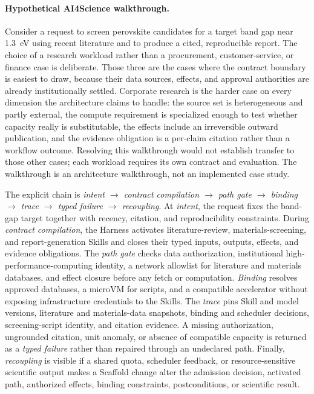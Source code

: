 \paragraph{Hypothetical AI4Science walkthrough.}
Consider a request to screen perovskite candidates for a target band gap near 1.3~eV using recent literature and to produce a cited, reproducible report. The choice of a research workload rather than a procurement, customer-service, or finance case is deliberate. Those three are the cases where the contract boundary is easiest to draw, because their data sources, effects, and approval authorities are already institutionally settled. Corporate research is the harder case on every dimension the architecture claims to handle: the source set is heterogeneous and partly external, the compute requirement is specialized enough to test whether capacity really is substitutable, the effects include an irreversible outward publication, and the evidence obligation is a per-claim citation rather than a workflow outcome. Resolving this walkthrough would not establish transfer to those other cases; each workload requires its own contract and evaluation. The walkthrough is an architecture walkthrough, not an implemented case study.

The explicit chain is \textit{intent $\rightarrow$ contract compilation $\rightarrow$ path gate $\rightarrow$ binding $\rightarrow$ trace $\rightarrow$ typed failure $\rightarrow$ recoupling}. At \textit{intent}, the request fixes the band-gap target together with recency, citation, and reproducibility constraints. During \textit{contract compilation}, the Harness activates literature-review, materials-screening, and report-generation Skills and closes their typed inputs, outputs, effects, and evidence obligations. The \textit{path gate} checks data authorization, institutional high-performance-computing identity, a network allowlist for literature and materials databases, and effect closure before any fetch or computation. \textit{Binding} resolves approved databases, a microVM for scripts, and a compatible accelerator without exposing infrastructure credentials to the Skills. The \textit{trace} pins Skill and model versions, literature and materials-data snapshots, binding and scheduler decisions, screening-script identity, and citation evidence. A missing authorization, ungrounded citation, unit anomaly, or absence of compatible capacity is returned as a \textit{typed failure} rather than repaired through an undeclared path. Finally, \textit{recoupling} is visible if a shared quota, scheduler feedback, or resource-sensitive scientific output makes a Scaffold change alter the admission decision, activated path, authorized effects, binding constraints, postconditions, or scientific result.

